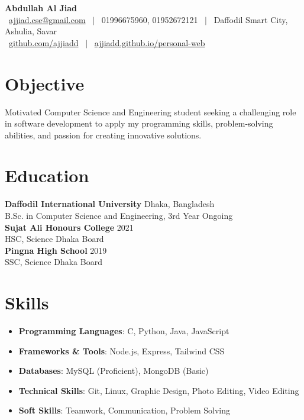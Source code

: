 \documentclass[11pt,a4paper]{article}
\begin{document}
\begin{center}
    {\Huge \textbf{Abdullah Al Jiad}} \\[0.2cm]
    {\small
    \faEnvelope \ \href{mailto:ajjiad.cse@gmail.com}{ajjiad.cse@gmail.com} \ $|$ 
    \faPhone \ 01996675960, 01952672121 \ $|$ 
    \faMapMarkerAlt \ Daffodil Smart City, Ashulia, Savar \\[0.1cm]
    \faGithub \ \href{https://github.com/ajjiadd}{github.com/ajjiadd} \ $|$ 
    \faGlobe \ \href{https://ajjiadd.github.io/personal-web/}{ajjiadd.github.io/personal-web}
    }
\end{center}

\section{Objective}
Motivated Computer Science and Engineering student seeking a challenging role in software development to apply my programming skills, problem-solving abilities, and passion for creating innovative solutions.

\section{Education}
\textbf{Daffodil International University} \hfill Dhaka, Bangladesh \\
B.Sc. in Computer Science and Engineering, 3rd Year \hfill Ongoing \\[0.2cm]
\textbf{Sujat Ali Honours College} \hfill 2021 \\
HSC, Science \hfill Dhaka Board \\[0.2cm]
\textbf{Pingna High School} \hfill 2019 \\
SSC, Science \hfill Dhaka Board

\section{Skills}
\begin{itemize}
    \item \textbf{Programming Languages}: C, Python, Java, JavaScript
    \item \textbf{Frameworks \& Tools}: Node.js, Express, Tailwind CSS
    \item \textbf{Databases}: MySQL (Proficient), MongoDB (Basic)
    \item \textbf{Technical Skills}: Git, Linux, Graphic Design, Photo Editing, Video Editing
    \item \textbf{Soft Skills}: Teamwork, Communication, Problem Solving
\end{itemize}
\end{document}
